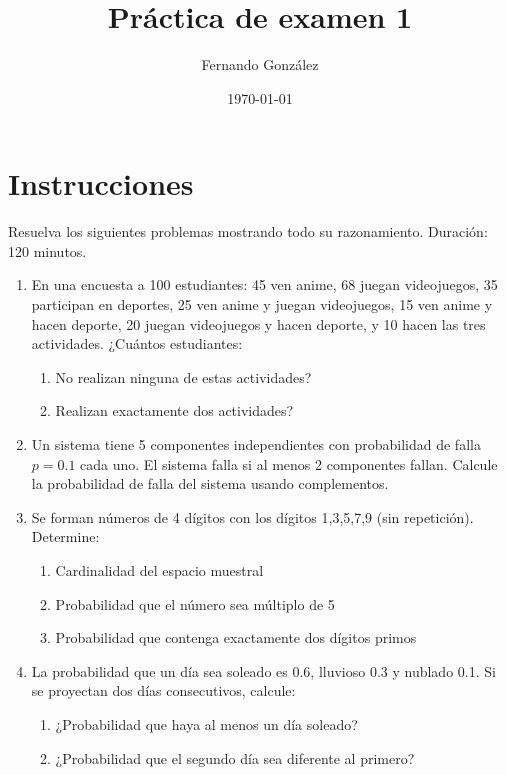 \documentclass[letterpaper]{article}
\title{Práctica de examen 1}
\author{Fernando González}
\date{\today}
\begin{document}
	\maketitle
	
	\section*{Instrucciones}
	Resuelva los siguientes problemas mostrando todo su razonamiento. Duración: 120 minutos.
	
	\begin{enumerate}		
		\item En una encuesta a 100 estudiantes: 45 ven anime, 68 juegan videojuegos, 35 participan en deportes, 25 ven anime y juegan videojuegos, 15 ven anime y hacen deporte, 20 juegan videojuegos y hacen deporte, y 10 hacen las tres actividades. ¿Cuántos estudiantes:
		\begin{enumerate}
			\item No realizan ninguna de estas actividades?
			\item Realizan exactamente dos actividades?
		\end{enumerate}
		
		\item Un sistema tiene 5 componentes independientes con probabilidad de falla $p = 0.1$ cada uno. El sistema falla si al menos 2 componentes fallan. Calcule la probabilidad de falla del sistema usando complementos.
		
		\item Se forman números de 4 dígitos con los dígitos 1,3,5,7,9 (sin repetición). Determine:
		\begin{enumerate}
			\item Cardinalidad del espacio muestral
			\item Probabilidad que el número sea múltiplo de 5
			\item Probabilidad que contenga exactamente dos dígitos primos
		\end{enumerate}
		
		\item La probabilidad que un día sea soleado es 0.6, lluvioso 0.3 y nublado 0.1. Si se proyectan dos días consecutivos, calcule:
		\begin{enumerate}
			\item ¿Probabilidad que haya al menos un día soleado?
			\item ¿Probabilidad que el segundo día sea diferente al primero?
		\end{enumerate}
		

\end{enumerate}
\end{document}
